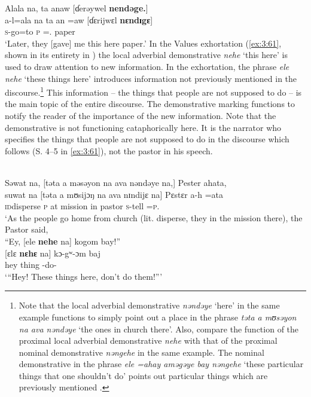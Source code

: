 \ea \label{ex:3:60}
Alala  na,  ta  anaw  [ɗerəywel  \textbf{nendəge.}]\\
\gll  a-l=ala  na      ta   an  =aw   [ɗɛrijwɛl   \textbf{nɛndɪgɛ}]\\
      \textsc{s}-go=to  {\PSP}   \textsc{p}  {\DAT}  ={\oneS}.{\IO}  paper        {\DEM}\\
\glt  ‘Later, they [gave] me this here paper.’ 
\z
\largerpage
In the Values exhortation (\ref{ex:3:61}, shown in its entirety in ) the local adverbial demonstrative \textit{nehe}  ‘this here’ is used to draw attention to new information. In the exhortation, the phrase \textit{ele nehe}  ‘these things here’ introduces information not previously mentioned in the discourse.\footnote{Note that the local adverbial demonstrative \textit{nəndəye} ‘here’ in the same example functions to simply point out a place in the phrase \textit{təta a mʊsəyon na ava nəndəye} ‘the ones in church there’. Also, compare the function of the proximal local adverbial demonstrative \textit{nehe}  with that of the proximal nominal demonstrative \textit{nəngehe}  in the same example. The nominal demonstrative in the phrase \textit{ele =ahay aməgəye bay nəngehe} ‘these particular things that one shouldn’t do’ points out particular things which are previously mentioned .} This information -- the things that people are not supposed to do -- is the main topic of the entire discourse. The demonstrative marking functions to notify the reader of the importance of the new information. Note that the demonstrative is not functioning cataphorically here. It is the narrator who specifies the things that people are not supposed to do in the discourse which follows (S. 4--5 in \ref{ex:3:61}), not the pastor in his speech. 

\ea \label{ex:3:61}\\
 Səwat  na,  [təta  a  məsəyon  na  ava  nəndəye  {na,}]  Pester  ahata,      \\
\gll  suwat na   [təta   a   mʊsijɔŋ   na   ava nɪndijɛ  na]   Pɛstɛr    a-h  =ata\\
      \textsc{id}disperse  {\PSP}  \textsc{p}  at  mission  {\PSP}  in  {\DEM}  {\PSP}  pastor  \textsc{s}-tell  =\textsc{p}.{\IO}\\
\glt  ‘As the people go home from church (lit. disperse, they in the mission there), the Pastor said, \\
\medskip
    “Ey, [ele \textbf{nehe} na] kogom  bay!”\\
 [{ɛlɛ} {\textbf{nɛhɛ}} na] kɔ-gʷ-ɔm   baj\\
      hey  thing  {\DEM}  {\PSP}  -do-{\twoP}    {\NEG}\\
\glt ‘“Hey! These things here, don’t do them!”’

